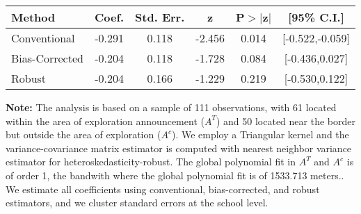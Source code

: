 \begin{table}[htbp]\centering
 \footnotesize 
\begin{tabular}{lccccc}
\hline\hline
Method & Coef. & Std. Err. & z & P$>|$z$|$ & [95\% C.I.] \\ 
\hline \hline  
Conventional & -0.291 & 0.118 & -2.456 & 0.014 & [-0.522,-0.059] \\ 
 Bias-Corrected & -0.204 & 0.118 & -1.728 & 0.084 & [-0.436,0.027] \\ 
Robust & -0.204 & 0.166 & -1.229 & 0.219 & [-0.530,0.122] \\ 
  \hline\hline
\end{tabular}
\label{table:rd}
\begin{tablenotes} 
  \justifying \tiny \textbf{Note: }    
   The analysis is based on a sample of 111 observations, with 61 located within the area of exploration announcement ($A^{T}$) and 50 located near the border but outside the area of exploration  ($A^{c}$). 
           We employ a Triangular kernel and the variance-covariance matrix estimator is computed with nearest neighbor variance estimator for heteroskedasticity-robust. The global polynomial fit in  $A^{T}$ and $A^{c}$ is of order 1, the bandwith where the global polynomial fit is of 1533.713 meters.. We estimate all coefficients using conventional, bias-corrected, and robust estimators, and we cluster standard errors at the school level. \end{tablenotes} 
 \end{table} 
